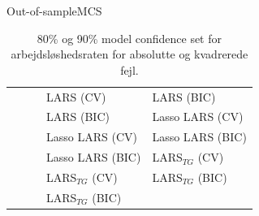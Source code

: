 \begin{frame}{Out-of-sample}{MCS}
\begin{table}[ht]
{\begin{tabular}{lllll}
& && LARS (CV)& LARS (BIC) \\
& && LARS (BIC)& Lasso LARS (CV) \\
& && Lasso LARS (CV) & Lasso LARS (BIC) \\
& && Lasso LARS (BIC) & LARS\(_{TG}\) (CV) \\ 
& && LARS\(_{TG}\) (CV) & LARS\(_{TG}\) (BIC) \\ 
& && LARS\(_{TG}\) (BIC) &  \\ \bottomrule
\end{tabular}}
\caption{80\% og 90\% model confidence set for arbejdsløshedsraten for absolutte og kvadrerede fejl.} \label{tab:mcs_tab}
\end{table}
\end{frame}


